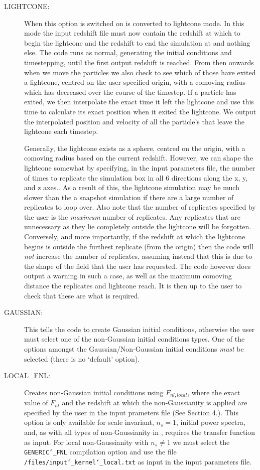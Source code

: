 \documentclass[12pt,twoside,a4paper]{article}
\begin{document}
\begin{description}
  \item[LIGHTCONE:]{When this option is switched on {\PICOLA} is converted to lightcone mode. In this mode the input redshift file must now contain the redshift at which to begin the lightcone and the redshift to end the simulation at and nothing else. The code runs as normal, generating the initial conditions and timestepping, until the first output redshift is reached. From then onwards when we move the particles we also check to see which of those have exited a lightcone, centred on the user-specified origin, with a comoving radius which has decreased over the course of the timestep. If a particle has exited, we then interpolate the exact time it left the lightcone and use this time to calculate its exact position when it exited the lightcone. We output the interpolated position and velocity of all the particle's that leave the lightcone each timestep. 

Generally, the lightcone exists as a sphere, centred on the origin, with a comoving radius based on the current redshift. However, we can shape the lightcone somewhat by specifying, in the input parameters file, the number of times to replicate the simulation box in all 6 directions along the x, y, and z axes.. As a result of this, the lightcone simulation may be much slower than the a snapshot simulation if there are a large number of replicates to loop over. Also note that the number of replicates specified by the user is the \emph{maximum} number of replicates. Any replicates that are unnecessary as they lie completely outside the lightcone will be forgotten. Conversely, and more importantly, if the redshift at which the lightcone begins is outside the furthest replicate (from the origin) then the code will \emph{not} increase the number of replicates, assuming instead that this is due to the shape of the field that the user has requested. The code however does output a warning in such a case, as well as the maximum comoving distance the replicates and lightcone reach. It is then up to the user to check that these are what is required.}

\item[GAUSSIAN:]{This tells the code to create Gaussian initial conditions, otherwise the user must select one of the non-Gaussian initial conditions types. One of the options amongst the Gaussian/Non-Gaussian initial conditions \emph{must} be selected (there is no `default' option).}

\item[LOCAL\_FNL:]{Creates non-Gaussian initial conditions using $F_{nl,local}$, where the exact value of $F_{nl}$ and the redshift at which the non-Gaussianity is applied are specified by the user in the input prameters file (See Section 4.). This option is only available for scale invariant, $n_{s} = 1$, initial power spectra, and, as with all types of non-Gaussianity in {\PICOLA}, requires the transfer function as input. For local non-Gaussianity with $n_{s} \neq 1$ we must select the \texttt{GENERIC\char`_FNL} compilation option and use the file \texttt{/files/input\char`_kernel\char`_local.txt} as input in the input parameters file.}


\end{description}
\end{document}
